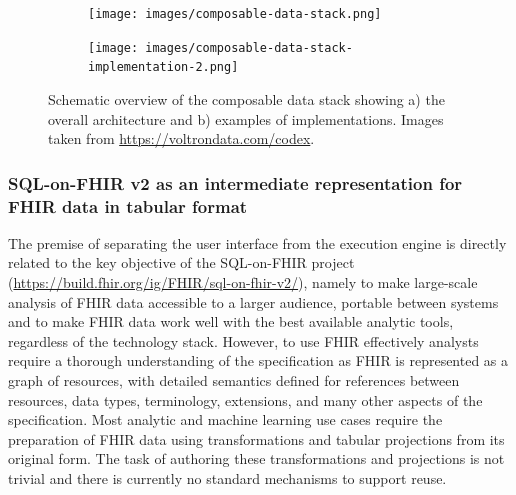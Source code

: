 \documentclass[
  authoryear]{elsarticle}
\begin{document}
\begin{figure}

\begin{minipage}{\linewidth}

\begin{figure}[H]

{\centering \texttt{[image: images/composable-data-stack.png]}

}


\end{figure}%

\end{minipage}%
\newline
\begin{minipage}{\linewidth}

\begin{figure}[H]

{\centering \texttt{[image: images/composable-data-stack-implementation-2.png]}

}


\end{figure}%

\end{minipage}%

\caption{\label{fig-composable-data-stack}Schematic overview of the
composable data stack showing a) the overall architecture and b)
examples of implementations. Images taken from
\url{https://voltrondata.com/codex}.}

\end{figure}%

\subsubsection{SQL-on-FHIR v2 as an intermediate representation for FHIR
data in tabular
format}\label{sql-on-fhir-v2-as-an-intermediate-representation-for-fhir-data-in-tabular-format}

The premise of separating the user interface from the execution engine
is directly related to the key objective of the SQL-on-FHIR project
(\url{https://build.fhir.org/ig/FHIR/sql-on-fhir-v2/}), namely to make
large-scale analysis of FHIR data accessible to a larger audience,
portable between systems and to make FHIR data work well with the best
available analytic tools, regardless of the technology stack. However,
to use FHIR effectively analysts require a thorough understanding of the
specification as FHIR is represented as a graph of resources, with
detailed semantics defined for references between resources, data types,
terminology, extensions, and many other aspects of the specification.
Most analytic and machine learning use cases require the preparation of
FHIR data using transformations and tabular projections from its
original form. The task of authoring these transformations and
projections is not trivial and there is currently no standard mechanisms
to support reuse.
\end{document}
